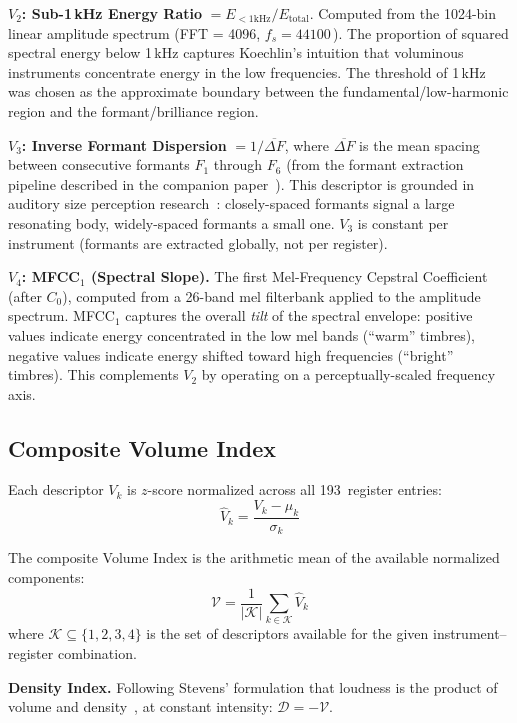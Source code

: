 \documentclass[journal]{IEEEtran}
\newcommand{\Hz}{\,\text{Hz}}
\begin{document}
\textbf{$V_2$: Sub-1\,kHz Energy Ratio} $= E_{<1\text{kHz}} / E_\text{total}$. Computed from the 1024-bin linear amplitude spectrum (FFT = 4096, $f_s = 44100$\Hz). The proportion of squared spectral energy below 1\,kHz captures Koechlin's intuition that voluminous instruments concentrate energy in the low frequencies. The threshold of 1\,kHz was chosen as the approximate boundary between the fundamental/low-harmonic region and the formant/brilliance region.

\textbf{$V_3$: Inverse Formant Dispersion} $= 1 / \overline{\Delta F}$, where $\overline{\Delta F}$ is the mean spacing between consecutive formants $F_1$ through $F_6$ (from the formant extraction pipeline described in the companion paper~\cite{Maresz2025}). This descriptor is grounded in auditory size perception research~\cite{Fitch1997, VanDinther2006}: closely-spaced formants signal a large resonating body, widely-spaced formants a small one. $V_3$ is constant per instrument (formants are extracted globally, not per register).

\textbf{$V_4$: MFCC$_1$ (Spectral Slope).} The first Mel-Frequency Cepstral Coefficient (after $C_0$), computed from a 26-band mel filterbank applied to the amplitude spectrum. MFCC$_1$ captures the overall \emph{tilt} of the spectral envelope: positive values indicate energy concentrated in the low mel bands (``warm'' timbres), negative values indicate energy shifted toward high frequencies (``bright'' timbres). This complements $V_2$ by operating on a perceptually-scaled frequency axis.

\subsection{Composite Volume Index}

Each descriptor $V_k$ is $z$-score normalized across all 193~register entries:
\begin{equation}
\hat{V}_k = \frac{V_k - \mu_k}{\sigma_k}
\end{equation}

The composite Volume Index is the arithmetic mean of the available normalized components:
\begin{equation}
\mathcal{V} = \frac{1}{|\mathcal{K}|} \sum_{k \in \mathcal{K}} \hat{V}_k
\end{equation}
where $\mathcal{K} \subseteq \{1,2,3,4\}$ is the set of descriptors available for the given instrument--register combination.

\textbf{Density Index.} Following Stevens' formulation that loudness is the product of volume and density~\cite{Stevens1965}, at constant intensity: $\mathcal{D} = -\mathcal{V}$.
\end{document}
